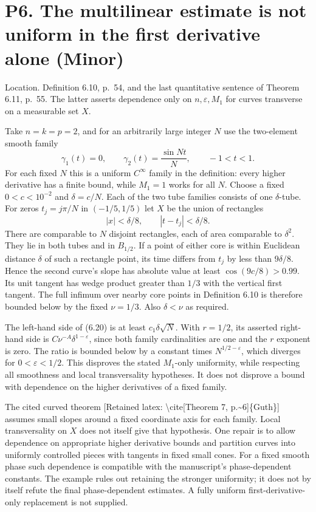 \documentclass[10pt]{article}
\begin{document}
\section*{P6. The multilinear estimate is not uniform in the first derivative alone (Minor)}
Location. Definition 6.10, p. 54, and the last quantitative sentence of Theorem 6.11, p. 55. The latter asserts dependence only on \(n,\varepsilon,M_1\) for curves transverse on a measurable set \(X\).\par
Take \(n=k=p=2\), and for an arbitrarily large integer \(N\) use the two-element smooth family \[\gamma_1(t)=0,\qquad \gamma_2(t)=\frac{\sin Nt}{N},
 \qquad -1<t<1.\] For each fixed \(N\) this is a uniform \(C^\infty\) family in the definition: every higher derivative has a finite bound, while \(M_1=1\) works for all \(N\). Choose a fixed \(0<c<10^{-2}\) and \(\delta=c/N\). Each of the two tube families consists of one \(\delta\)-tube. For zeros \(t_j=j\pi/N\) in \((-1/5,1/5)\) let \(X\) be the union of rectangles \[|x|<\delta/8,\qquad |t-t_j|<\delta/8 .\] There are comparable to \(N\) disjoint rectangles, each of area comparable to \(\delta^2\). They lie in both tubes and in \(B_{1/2}\). If a point of either core is within Euclidean distance \(\delta\) of such a rectangle point, its time differs from \(t_j\) by less than \(9\delta/8\). Hence the second curve’s slope has absolute value at least \(\cos(9c/8)>0.99\). Its unit tangent has wedge product greater than \(1/3\) with the vertical first tangent. The full infimum over nearby core points in Definition 6.10 is therefore bounded below by the fixed \(\nu=1/3\). Also \(\delta<\nu\) as required.\par
The left-hand side of (6.20) is at least \(c_1\delta\sqrt N\). With \(r=1/2\), its asserted right-hand side is \(C\nu^{-A}\delta^{1-\varepsilon}\), since both family cardinalities are one and the \(r\) exponent is zero. The ratio is bounded below by a constant times \(N^{1/2-\varepsilon}\), which diverges for \(0<\varepsilon<1/2\). This disproves the stated \(M_1\)-only uniformity, while respecting all smoothness and local transversality hypotheses. It does not disprove a bound with dependence on the higher derivatives of a fixed family.\par
The cited curved theorem [Retained latex: \textbackslash{}cite[Theorem 7, p.\textasciitilde{}6]\{Guth\}] assumes small slopes around a fixed coordinate axis for each family. Local transversality on \(X\) does not itself give that hypothesis. One repair is to allow dependence on appropriate higher derivative bounds and partition curves into uniformly controlled pieces with tangents in fixed small cones. For a fixed smooth phase such dependence is compatible with the manuscript’s phase-dependent constants. The example rules out retaining the stronger uniformity; it does not by itself refute the final phase-dependent estimates. A fully uniform first-derivative-only replacement is not supplied.\par
\end{document}
